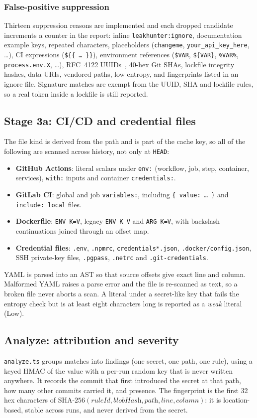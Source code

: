 \documentclass[conference]{IEEEtran}
\newcommand{\code}[1]{\texttt{#1}}
\begin{document}
\subsubsection{False-positive suppression}
Thirteen suppression reasons are implemented and each dropped candidate increments a counter in
the report: inline \code{leakhunter:ignore}, documentation example keys, repeated characters,
placeholders (\code{changeme}, \code{your\_api\_key\_here}, \ldots), CI expressions
(\code{\$\{\{ \ldots{} \}\}}), environment references (\code{\$VAR}, \code{\$\{VAR\}},
\code{\%VAR\%}, \code{process.env.X}, \ldots), RFC~4122 UUIDs~\cite{rfc4122}, 40-hex Git SHAs,
lockfile integrity hashes, data URIs, vendored paths, low entropy, and fingerprints listed in an
ignore file. Signature matches are exempt from the UUID, SHA and lockfile rules, so a real token
inside a lockfile is still reported.

\subsection{Stage 3a: CI/CD and credential files}\label{sec:ci}
The file kind is derived from the path and is part of the cache key, so all of the following are
scanned across history, not only at \code{HEAD}:
\begin{itemize}
\item \textbf{GitHub Actions}: literal scalars under \code{env:} (workflow, job, step, container,
  services), \code{with:} inputs and container \code{credentials:}.
\item \textbf{GitLab CI}: global and job \code{variables:}, including \code{\{ value: \ldots{} \}}
  and \code{include: local} files.
\item \textbf{Dockerfile}: \code{ENV K=V}, legacy \code{ENV K V} and \code{ARG K=V}, with
  backslash continuations joined through an offset map.
\item \textbf{Credential files}: \code{.env}, \code{.npmrc}, \code{credentials*.json},
  \code{.docker/config.json}, SSH private-key files, \code{.pgpass}, \code{.netrc} and
  \code{.git-credentials}.
\end{itemize}
YAML is parsed into an AST so that source offsets give exact line and column. Malformed YAML
raises a parse error and the file is re-scanned as text, so a broken file never aborts a scan.
A literal under a secret-like key that fails the entropy check but is at least eight characters
long is reported as a \emph{weak} literal (Low).

\subsection{Analyze: attribution and severity}
\code{analyze.ts} groups matches into findings (one secret, one path, one rule), using a keyed HMAC
of the value with a per-run random key that is never written anywhere. It records the commit
that first introduced the secret at that path, how many other commits carried it, and presence.
The fingerprint is the first 32 hex characters of
$\mathrm{SHA\text{-}256}(\textit{ruleId}, \textit{blobHash}, \textit{path}, \textit{line},
\textit{column})$: it is location-based, stable across runs, and never derived from the secret.
\end{document}
